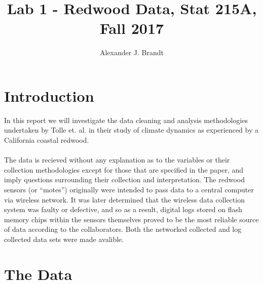 \documentclass[english]{article}\usepackage[]{graphicx}\usepackage[]{color}
\begin{document}
\title{Lab 1 - Redwood Data, Stat 215A, Fall 2017}

\author{Alexander J. Brandt}

\maketitle





\section{Introduction}

In this report we will investigate the data cleaning and analysis methodologies undertaken by Tolle et. al. in their study of climate dynamics as experienced by a California coastal redwood.\\\\
The data is recieved without any explanation as to the variables or their collection
methodologies except for those that are specified in the paper, and
imply questions surrounding their collection and interpretation.  The redwood sensors (or ``motes'')
originally were intended to pass data to a central computer via wireless network.  It was
later determined that the wireless data collection system was faulty or defective, and
so as a result, digital logs stored on flash memory chips within the sensors themselves 
proved to be the most reliable source of data according to the collaborators.  Both the 
networked collected and log collected data sets were made avalible.

\section{The Data}
\end{document}
